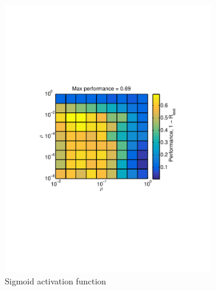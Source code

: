 \documentclass[journal,a4paper,onecolumn,11pt]{IEEEtran}
\begin{document}
\begin{figure}[!h] 
\centering
\begin{subfigure}{.5\textwidth}
  \centering
       \includegraphics[width=\textwidth]{Opt_sigmoid2.pdf}
  \caption{Sigmoid activation function}
    \label{fig:Opt_sigmoid2}
\end{subfigure}%
\begin{subfigure}{.5\textwidth}
  \centering

\end{subfigure}
\end{figure}
\end{document}
